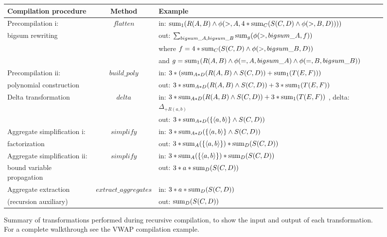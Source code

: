 \begin{figure*}
\begin{center}
\begin{tabular}{|l|c|l|}
\hline
Compilation procedure & Method & Example \\
\hline Precompilation i:            & $flatten$
& in: $\mathrm{sum}_{1}(R(A,B) \wedge \phi(>,A,4*
           \mathrm{sum}_{C}(S(C,D) \wedge \phi(>,B,D))))$
\\
bigsum rewriting & & out: $\sum_{bigsum\_A, bigsum\_B}{\mathrm{sum}_{g} (\phi(>,bigsum\_A, f))}$
\\
& & where $f = 4* \mathrm{sum}_{C}(S(C,D) \wedge \phi(>,bigsum\_B,D))$
\\
& & and $g = \mathrm{sum}_{1}(R(A,B) \wedge \phi(=,A,bigsum\_A)
           \wedge \phi(=,B,bigsum\_B))$
\\
\hline Precompilation ii:  & $build\_poly$
& in: $3 * (\mathrm{sum}_{A*D}(R(A,B) \wedge S(C,D)) + \mathrm{sum}_{1}(T(E,F)))$
\\
polynomial construction &
& out: $3*\mathrm{sum}_{A*D}(R(A,B) \wedge S(C,D)) + 3*\mathrm{sum}_{1}(T(E,F))$
\\
\hline Delta transformation        & $delta$
& in:
    $ 3*\mathrm{sum}_{A*D}(R(A,B) \wedge S(C,D)) +
     3*\mathrm{sum}_{1}(T(E,F))$
, delta: $\Delta_{+R(a,b)}$
\\
& & out:
    $3*\mathrm{sum}_{A*D}(\{{\langle a,b\rangle}\} \wedge S(C,D))$
\\
\hline Aggregate simplification i:  & $simplify$
& in: $3*\mathrm{sum}_{A*D}(\{{\langle a,b\rangle}\} \wedge S(C,D))$
\\
factorization & & out:
    $3*\mathrm{sum}_{A}(\{{\langle a,b\rangle}\})*\mathrm{sum}_{D}(S(C,D))$
\\
\hline Aggregate simplification ii: & $simplify$
& in: $3*\mathrm{sum}_{A}(\{{\langle a,b\rangle}\})*\mathrm{sum}_{D}(S(C,D))$
\\
bound variable propagation & & out:
    $3*a*\mathrm{sum}_{D}(S(C,D))$
\\
\hline Aggregate extraction        & $extract\_aggregates$
& in: $3*a*\mathrm{sum}_{D}(S(C,D))$
\\
(recursion auxiliary) & & out: $\mathrm{sum}_{D}(S(C,D))$
\\
\hline
\end{tabular}
\caption{Summary of transformations performed during recursive compilation, to
show the input and output of each transformation. For a complete walkthrough see
the VWAP compilation example.}
\label{fig:methodsummary}
\end{center}
\end{figure*}


